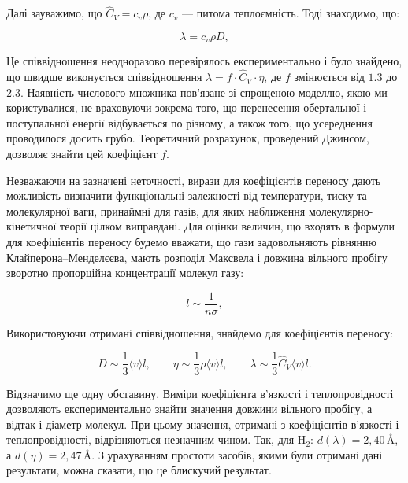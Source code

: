 Далі зауважимо, що $\hat{C}_V = c_v \rho$, де $c_v$ — питома теплоємність.
Тоді знаходимо, що:

\begin{equation}
	\lambda = c_v \rho D ,
	\label{eq:157.2}
\end{equation}

Це співвідношення неодноразово перевірялось експериментально і було знайдено,
що швидше виконується співвідношення
$\lambda = f \cdot \hat{C}_V \cdot \eta$, де $f$ змінюється від $1.3$ до $2.3$.
Наявність числового множника пов'язане зі спрощеною моделлю, якою ми
користувалися, не враховуючи зокрема того, що перенесення обертальної і
поступальної енергії відбувається по різному, а також того, що усереднення
проводилося досить грубо. Теоретичний розрахунок, проведений Джинсом,
дозволяє знайти цей коефіцієнт $f$.

Незважаючи на зазначені неточності, вирази для коефіцієнтів переносу дають
можливість визначити функціональні залежності від температури, тиску та
молекулярної ваги, принаймні для газів, для яких наближення
молекулярно-кінетичної теорії цілком виправдані. Для оцінки величин, що
входять в формули для коефіцієнтів переносу будемо вважати, що гази
задовольняють рівнянню Клайперона–Менделєєва, мають розподіл Максвела і
довжина вільного пробігу зворотно пропорційна концентрації молекул газу:

\begin{equation}
	l \sim \frac{1}{n \sigma},
	\label{eq:157.3}
\end{equation}

Використовуючи отримані співвідношення, знайдемо для коефіцієнтів переносу:

\begin{equation}
	D \sim \frac{1}{3} \langle v \rangle l,
	\qquad
	\eta \sim \frac{1}{3} \rho \langle v \rangle l,
	\qquad
	\lambda \sim \frac{1}{3} \hat{C}_V \langle v \rangle l .
	\label{eq:157.4}
\end{equation}

Відзначимо ще одну обставину. Виміри коефіцієнта в'язкості і теплопровідності
дозволяють експериментально знайти значення довжини вільного пробігу, а відтак
і діаметр молекул. При цьому значення, отримані з коефіцієнтів в'язкості і
теплопровідності, відрізняються незначним чином. Так, для H$_2$:
$d(\lambda) = 2{,}40\,\text{\AA}$, а $d(\eta) = 2{,}47\,\text{\AA}$.
З урахуванням простоти засобів, якими були отримані дані результати, можна
сказати, що це блискучий результат.

